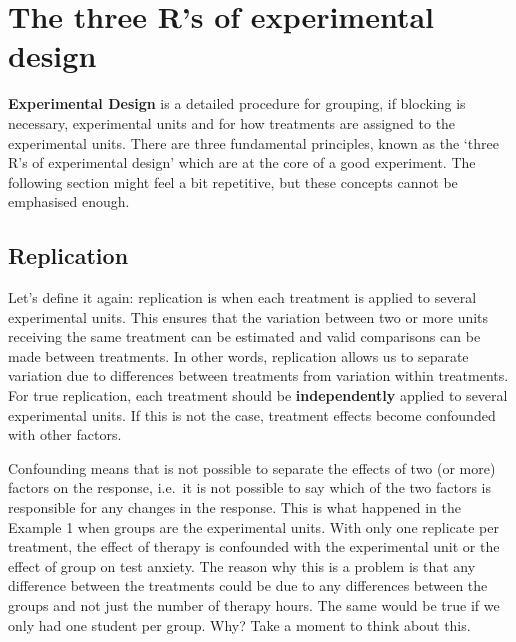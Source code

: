 \documentclass[
  letterpaper,
]{book}
\begin{document}
\chapter*{The three R's of experimental
design}\label{the-three-rs-of-experimental-design}


\textbf{Experimental Design} is a detailed procedure for grouping, if
blocking is necessary, experimental units and for how treatments are
assigned to the experimental units. There are three fundamental
principles, known as the `three R's of experimental design' which are at
the core of a good experiment. The following section might feel a bit
repetitive, but these concepts cannot be emphasised enough.

\section*{Replication}\label{replication}


Let's define it again: replication is when each treatment is applied to
several experimental units. This ensures that the variation between two
or more units receiving the same treatment can be estimated and valid
comparisons can be made between treatments. In other words, replication
allows us to separate variation due to differences between treatments
from variation within treatments. For true replication, each treatment
should be \textbf{independently} applied to several experimental units.
If this is not the case, treatment effects become confounded with other
factors.

Confounding means that is not possible to separate the effects of two
(or more) factors on the response, i.e.~it is not possible to say which
of the two factors is responsible for any changes in the response. This
is what happened in the Example 1 when groups are the experimental
units. With only one replicate per treatment, the effect of therapy is
confounded with the experimental unit or the effect of group on test
anxiety. The reason why this is a problem is that any difference between
the treatments could be due to any differences between the groups and
not just the number of therapy hours. The same would be true if we only
had one student per group. Why? Take a moment to think about this.
\end{document}
